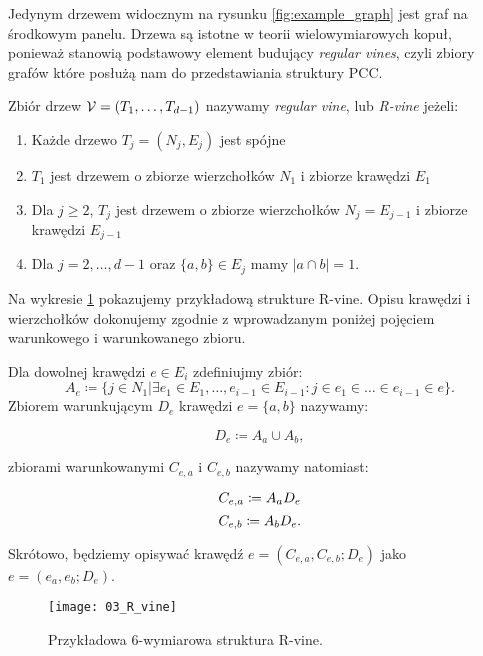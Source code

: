 Jedynym drzewem widocznym na rysunku \ref{fig:example_graph} jest graf na środkowym panelu. Drzewa są istotne w teorii wielowymiarowych kopuł, ponieważ stanowią podstawowy element budujący \emph{regular vines}, czyli zbiory grafów które posłużą nam do przedstawiania struktury PCC.

\begin{df}
	Zbiór drzew $\mathcal{V} = (T_1,\dots, T_{d-1})$ nazywamy \emph{regular vine}, lub \emph{R-vine} jeżeli:
	
	\begin{enumerate}
		\item Każde drzewo $T_j=(N_j, E_j)$ jest spójne
		\item $T_1$ jest drzewem o zbiorze wierzchołków $N_1$ i zbiorze krawędzi $E_1$
		\item Dla $j\geqslant2$, $T_j$ jest drzewem o zbiorze wierzchołków $N_j = E_{j-1}$ i zbiorze krawędzi $E_{j-1}$
		\item Dla $j = 2, \dots, d- 1$ oraz $\{a, b\} \in E_j$ mamy $ \vert a \cap b \vert = 1$. 
	\end{enumerate}
\end{df}

Na wykresie \ref{fig:r_vine} pokazujemy przykładową strukture R-vine. Opisu krawędzi i wierzchołków dokonujemy zgodnie z wprowadzanym poniżej pojęciem warunkowego i warunkowanego zbioru.

\begin{df}
	Dla dowolnej krawędzi $e\in E_i$ zdefiniujmy zbiór:
	$$ A_e\coloneqq \{j\in N_1\vert \exists e_1 \in E_1, \dots, e_{i-1}\in E_{i-1}: j\in e_1\in \dots \in e_{i-1}\in e\}.$$
	Zbiorem warunkującym $D_e$ krawędzi $e=\{a, b\}$ nazywamy:
	
	$$ D_e \coloneqq A_a \cup A_b,$$
	
	zbiorami warunkowanymi $C_{e, a}$ i $C_{e, b}$ nazywamy natomiast:
	
	$$ C_{e, a} \coloneqq A_a\\ D_e$$
	$$ C_{e, b} \coloneqq A_b\\ D_e.$$
	
	Skrótowo, będziemy opisywać krawędź $e = (C_{e, a}, C_{e, b}; D_e)$ jako $e = (e_a, e_b; D_e)$.
\end{df}


\begin{figure}[h]
	\centering
	\texttt{[image: 03\_R\_vine]}
	
	\caption{Przykładowa 6-wymiarowa struktura R-vine. \label{fig:r_vine}}
\end{figure}

